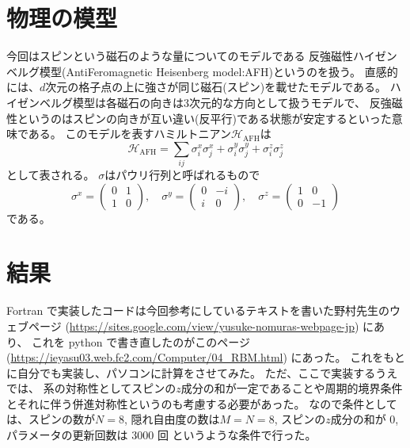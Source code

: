 \documentclass[twocolumn,10pt,dvipdfmx,a4paper]{jsarticle}
\begin{document}
\section{物理の模型}
今回はスピンという磁石のような量についてのモデルである
反強磁性ハイゼンベルグ模型(AntiFeromagnetic Heisenberg model:AFH)というのを扱う。
直感的には、\(d\)次元の格子点の上に強さが同じ磁石(スピン)を載せたモデルである。
ハイゼンベルグ模型は各磁石の向きは3次元的な方向として扱うモデルで、
反強磁性というのはスピンの向きが互い違い(反平行)である状態が安定するといった意味である。
このモデルを表すハミルトニアン\(\mathcal{H}_{\text{AFH}}\)は
\begin{equation}
    \mathcal{H}_{\text{AFH}} = \sum_{ij} \sigma_i^x\sigma_j^x + \sigma_i^y\sigma_j^y+ \sigma_i^z\sigma_j^z
\end{equation}
として表される。
\(\sigma\)はパウリ行列と呼ばれるもので
\begin{equation}
    \sigma^x = \begin{pmatrix}
        0 & 1\\
        1 & 0
    \end{pmatrix}, \quad
    \sigma^y = \begin{pmatrix}
        0 & -i\\
        i & 0
    \end{pmatrix}, \quad
    \sigma^z = \begin{pmatrix}
        1 & 0\\
        0 & -1
    \end{pmatrix}
\end{equation}
である。

\section{結果}
Fortran で実装したコードは今回参考にしているテキスト\cite{SGC191}を書いた野村先生のウェブページ
(\url{https://sites.google.com/view/yusuke-nomuras-webpage-jp})
にあり、
これを python で書き直したのがこのページ(\url{https://ieyasu03.web.fc2.com/Computer/04_RBM.html})
にあった。
これをもとに自分でも実装し、パソコンに計算をさせてみた。
ただ、ここで実装するうえでは、
系の対称性としてスピンの\(z\)成分の和が一定であることや周期的境界条件とそれに伴う併進対称性というのも考慮する必要があった。
なので条件としては、スピンの数が\(N=8\),
隠れ自由度の数は\(M=N=8\),
スピンの\(z\)成分の和が 0, パラメータの更新回数は 3000 回
というような条件で行った。
\end{document}
